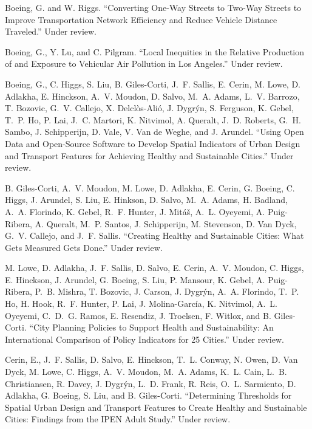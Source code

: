 \documentclass[12pt,letterpaper]{report}
\begin{document}
    \begin{tablist}

    \item[\the\year] \tab{}Boeing, G. and W. Riggs. \enquote{Converting One-Way Streets to Two-Way Streets to Improve Transportation Network Efficiency and Reduce Vehicle Distance Traveled.} Under review.

    \item[\the\year] \tab{}Boeing, G., Y. Lu, and C. Pilgram. \enquote{Local Inequities in the Relative Production of and Exposure to Vehicular Air Pollution in Los Angeles.} Under review.

    \item[\the\year] \tab{}Boeing, G., C. Higgs, S. Liu, B. Giles-Corti, J.~F. Sallis, E. Cerin, M. Lowe, D. Adlakha, E. Hinckson, A.~V. Moudon, D. Salvo, M.~A. Adams, L.~V. Barrozo, T. Bozovic, G.~V. Callejo, X. Delclòs-Alió, J. Dygrýn, S. Ferguson, K. Gebel, T.~P. Ho, P. Lai, J.~C. Martori, K. Nitvimol, A. Queralt, J.~D. Roberts, G.~H. Sambo, J. Schipperijn, D. Vale, V. Van de Weghe, and J. Arundel. \enquote{Using Open Data and Open-Source Software to Develop Spatial Indicators of Urban Design and Transport Features for Achieving Healthy and Sustainable Cities.} Under review.

    \item[\the\year] \tab{}B. Giles-Corti, A.~V. Moudon, M. Lowe, D. Adlakha, E. Cerin, G. Boeing, C. Higgs, J. Arundel, S. Liu, E. Hinkson, D. Salvo, M.~A. Adams, H. Badland, A.~A. Florindo, K. Gebel, R.~F. Hunter, J. Mitáš, A.~L. Oyeyemi, A. Puig-Ribera, A. Queralt, M.~P. Santos, J. Schipperijn, M. Stevenson, D. Van Dyck, G.~V. Callejo, and J.~F. Sallis. \enquote{Creating Healthy and Sustainable Cities: What Gets Measured Gets Done.} Under review.

    \item[\the\year] \tab{}M. Lowe, D. Adlakha, J.~F. Sallis, D. Salvo, E. Cerin, A.~V. Moudon, C. Higgs, E. Hinckson, J. Arundel, G. Boeing, S. Liu, P. Mansour, K. Gebel, A. Puig-Ribera, P.~B. Mishra, T. Bozovic, J. Carson, J. Dygrýn, A.~A. Florindo, T.~P. Ho, H. Hook, R.~F. Hunter, P. Lai, J. Molina-García, K. Nitvimol, A.~L. Oyeyemi, C.~D.~G. Ramos, E. Resendiz, J. Troelsen, F. Witlox, and B. Giles-Corti. \enquote{City Planning Policies to Support Health and Sustainability: An International Comparison of Policy Indicators for 25 Cities.} Under review.

    \item[\the\year] \tab{}Cerin, E., J.~F. Sallis, D. Salvo, E. Hinckson, T.~L. Conway, N. Owen, D. Van Dyck, M. Lowe, C. Higgs, A.~V. Moudon, M.~A. Adams, K.~L. Cain, L.~B. Christiansen, R. Davey, J. Dygrýn, L.~D. Frank, R. Reis, O.~L. Sarmiento, D. Adlakha, G. Boeing, S. Liu, and B. Giles-Corti. \enquote{Determining Thresholds for Spatial Urban Design and Transport Features to Create Healthy and Sustainable Cities: Findings from the IPEN Adult Study.} Under review.


\end{tablist}
\end{document}

